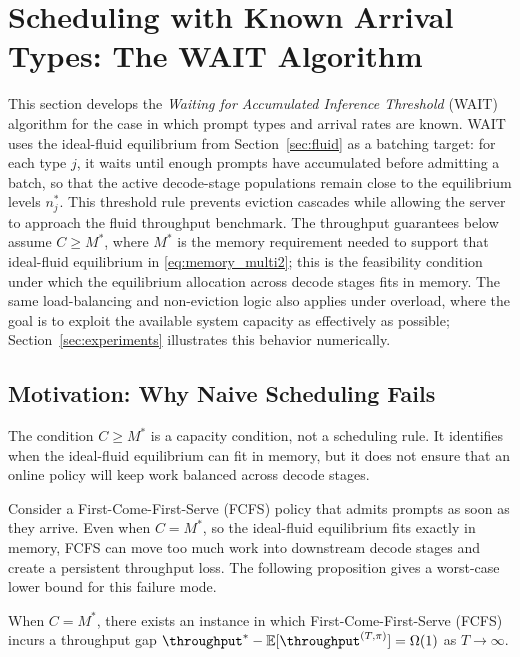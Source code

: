 \section{Scheduling with Known Arrival Types: The WAIT Algorithm}
\label{sec:wait}

This section develops the \textit{Waiting for Accumulated Inference Threshold} (WAIT) algorithm for the case in which prompt types and arrival rates are known. WAIT uses the ideal-fluid equilibrium from Section~\ref{sec:fluid} as a batching target: for each type \(j\), it waits until enough prompts have accumulated before admitting a batch, so that the active decode-stage populations remain close to the equilibrium levels \(n_j^*\). This threshold rule prevents eviction cascades while allowing the server to approach the fluid throughput benchmark. The throughput guarantees below assume \(C \ge M^*\), where \(M^*\) is the memory requirement needed to support that ideal-fluid equilibrium in \eqref{eq:memory_multi2}; this is the feasibility condition under which the equilibrium allocation across decode stages fits in memory. The same load-balancing and non-eviction logic also applies under overload, where the goal is to exploit the available system capacity as effectively as possible; Section~\ref{sec:experiments} illustrates this behavior numerically.

\subsection{Motivation: Why Naive Scheduling Fails}
\label{subsec:wait_motivation}

The condition \(C\ge M^*\) is a capacity condition, not a scheduling rule. It identifies when the ideal-fluid equilibrium can fit in memory, but it does not ensure that an online policy will keep work balanced across decode stages.

Consider a First-Come-First-Serve (FCFS) policy that admits prompts as soon as they arrive. Even when \(C=M^*\), so the ideal-fluid equilibrium fits exactly in memory, FCFS can move too much work into downstream decode stages and create a persistent throughput loss. The following proposition gives a worst-case lower bound for this failure mode.

\begin{proposition}\label{prop:lower_bound_FCFS}
When \(C=M^*\), there exists an instance in which First-Come-First-Serve (FCFS) incurs a throughput gap \(\throughput^* - \mathbb{E}[\throughput^{(T,\pi)}] = \Omega(1)\) as \(T \to \infty\).
\end{proposition}

